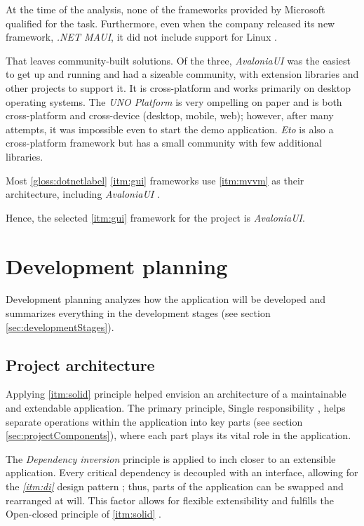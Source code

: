 At the time of the analysis, none of the frameworks provided by Microsoft qualified for the task. Furthermore, even when the company released its new framework, \textit{.NET MAUI}, it did not include support for Linux \cite{anderson_net_2022}.

That leaves community-built solutions.
Of the three, \textit{AvaloniaUI} was the easiest to get up and running and had a sizeable community, with extension libraries and other projects to support it. It is cross-platform and works primarily on desktop operating systems. The \textit{UNO Platform} is very ompelling on paper and is both cross-platform and cross-device (desktop, mobile, web); however, after many attempts, it was impossible even to start the demo application. \textit{Eto} is also a cross-platform framework but has a small community with few additional libraries.

Most \ref{gloss:dotnetlabel} \ref{itm:gui} frameworks use \ref{itm:mvvm} as their architecture, including \textit{AvaloniaUI} \cite{katz_mvvm_2022}.

Hence, the selected \ref{itm:gui} framework for the project is \textit{AvaloniaUI}.

\section{Development planning}

Development planning analyzes how the application will be developed and summarizes everything in the development stages (see section \ref{sec:developmentStages}).

\subsection{Project architecture} \label{sec:projectArchitecture}

Applying \ref{itm:solid} principle helped envision an architecture of a maintainable and extendable application.
The primary principle, Single responsibility \cite{hall_adaptive_2017}, helps separate operations within the application into key parts (see section \ref{sec:projectComponents}), where each part plays its vital role in the application.

The \textit{Dependency inversion} principle \cite{hall_adaptive_2017} is applied to inch closer to an extensible application. Every critical dependency is decoupled with an interface, allowing for the \textit{\ref{itm:di}} design pattern \cite{deursen_dependency_2019}; thus, parts of the application can be swapped and rearranged at will. This factor allows for flexible extensibility and fulfills the Open-closed principle of \ref{itm:solid} \cite{hall_adaptive_2017}.

